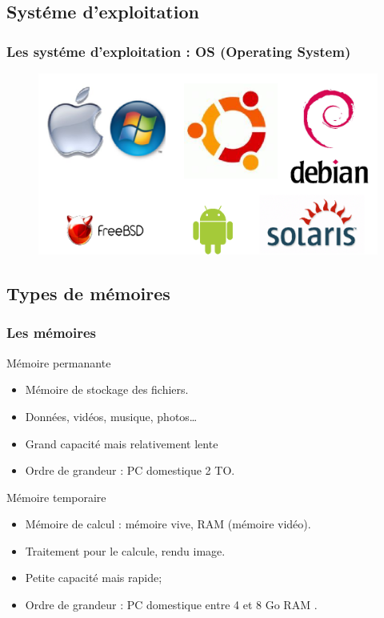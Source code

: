 \documentclass{beamer}
\begin{document}
	\subsection{Systéme d'exploitation}
	\begin{frame}
		\frametitle{Les systéme d'exploitation : OS (Operating System)}
		\begin{figure}
				\includegraphics[scale=0.55]{image/OSimage.png}
			\end{figure}
	\end{frame}

	\subsection{Types de mémoires}
	\begin{frame}
		\frametitle{Les mémoires}
		\begin{block}{Mémoire permanante}
			\begin{itemize}
				\item Mémoire de stockage des fichiers.
				\item Données, vidéos, musique, photos\dots
				\item Grand capacité mais relativement lente
				\item Ordre de grandeur : PC domestique 2 TO.
			\end{itemize}
		\end{block}

		\begin{block}{Mémoire temporaire}
			\begin{itemize}
				\item Mémoire de calcul : mémoire vive, RAM (mémoire vidéo).
				\item Traitement pour le calcule, rendu image.
				\item Petite capacité mais rapide;
				\item Ordre de grandeur : PC domestique entre 4 et 8 Go RAM .
			\end{itemize}
		\end{block}

	\end{frame}
\end{document}
